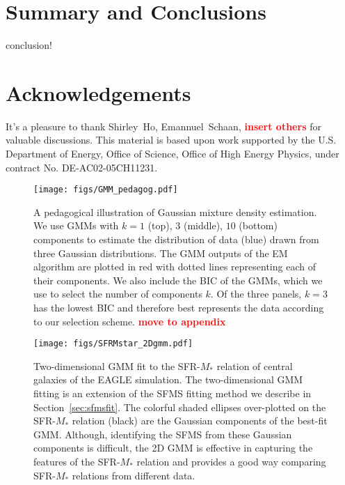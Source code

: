 \documentclass[preprint2,tighten]{aastex62}
\newcommand{\todo}[1]{{\bf \textcolor{red}{ #1}}}
\begin{document}
\section{Summary and Conclusions} \label{sec:summary}
conclusion!

\section*{Acknowledgements}
It's a pleasure to thank
	Shirley~Ho, 
	Emannuel~Schaan, 
    \todo{insert others} 
for valuable discussions. 
This material is based upon work supported by the U.S. Department
of Energy, Office of Science, Office of High Energy Physics, under
contract No. DE-AC02-05CH11231.
\appendix
\begin{figure}
\begin{center}
\texttt{[image: figs/GMM\_pedagog.pdf]} 
\caption{A pedagogical illustration of Gaussian mixture density estimation. 
We use GMMs with $k = 1$ (top), $3$ (middle), $10$ (bottom) components to estimate 
the distribution of data (blue) drawn from three Gaussian distributions. The GMM 
outputs of the EM algorithm are plotted in red with dotted lines representing each 
of their components. We also include the BIC of the GMMs, which we use to select 
the number of components $k$. Of the three panels, $k=3$ has the lowest BIC and 
therefore best represents the data according to our selection 
scheme. \todo{move to appendix}} \label{fig:gmm_pedagog}
\end{center}
\end{figure}

\begin{figure*}
\begin{center}
\texttt{[image: figs/SFRMstar\_2Dgmm.pdf]} 
\caption{Two-dimensional GMM fit to the SFR-$M_*$ relation of central galaxies
of the EAGLE simulation. The two-dimensional GMM fitting is an extension of the 
SFMS fitting method we describe in Section~\ref{sec:sfmsfit}. The colorful shaded
ellipses over-plotted on the SFR-$M_*$ relation (black) are the Gaussian components 
of the best-fit GMM. Although, identifying the SFMS from these Gaussian components
is difficult, the 2D GMM is effective in capturing the features of the SFR-$M_*$ 
relation and provides a good way comparing SFR-$M_*$ relations from different data.
} \label{fig:2dgmm}
\end{center}
\end{figure*}
\end{document}

